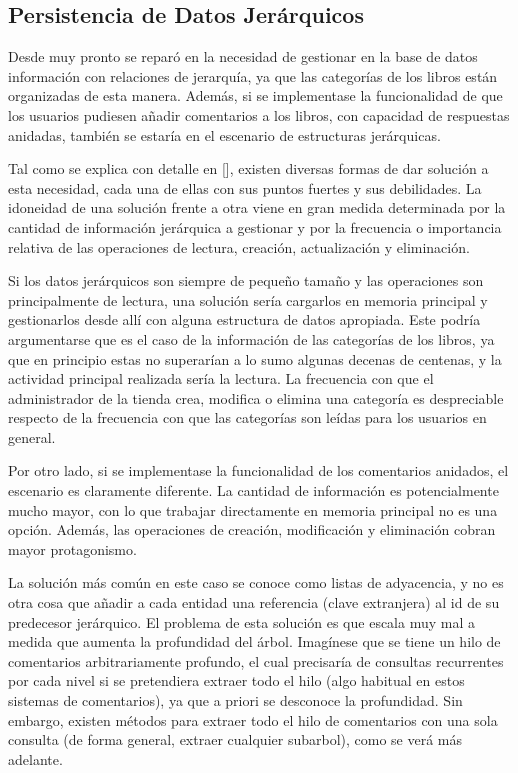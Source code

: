 \documentclass[a4paper]{report}
\begin{document}
    \subsection{Persistencia de Datos Jerárquicos}
    Desde muy pronto se reparó en la necesidad de gestionar en la base de datos información con relaciones de jerarquía, ya que las categorías de los libros están organizadas de esta manera. Además, si se implementase la funcionalidad de que los usuarios pudiesen añadir comentarios a los libros, con capacidad de respuestas anidadas, también se estaría en el escenario de estructuras jerárquicas.
    
    Tal como se explica con detalle en [], existen diversas formas de dar solución a esta necesidad, cada una de ellas con sus puntos fuertes y sus debilidades. La idoneidad de una solución frente a otra viene en gran medida determinada por la cantidad de información jerárquica a gestionar y por la frecuencia o importancia relativa de las operaciones de lectura, creación, actualización y eliminación.
    
    Si los datos jerárquicos son siempre de pequeño tamaño y las operaciones son principalmente de lectura, una solución sería cargarlos en memoria principal y gestionarlos desde allí con alguna estructura de datos apropiada. Este podría argumentarse que es el caso de la información de las categorías de los libros, ya que en principio estas no superarían a lo sumo algunas decenas de centenas, y la actividad principal realizada sería la lectura. La frecuencia con que el administrador de la tienda crea, modifica o elimina una categoría es despreciable respecto de la frecuencia con que las categorías son leídas para los usuarios en general.
    
    Por otro lado, si se implementase la funcionalidad de los comentarios anidados, el escenario es claramente diferente. La cantidad de información es potencialmente mucho mayor, con lo que trabajar directamente en memoria principal no es una opción. Además, las operaciones de creación, modificación y eliminación cobran mayor protagonismo.
    
    La solución más común en este caso se conoce como listas de adyacencia, y no es otra cosa que añadir a cada entidad una referencia (clave extranjera) al id de su predecesor jerárquico. El problema de esta solución es que escala muy mal a medida que aumenta la profundidad del árbol. Imagínese que se tiene un hilo de comentarios arbitrariamente profundo, el cual precisaría de consultas recurrentes por cada nivel si se pretendiera extraer todo el hilo (algo habitual en estos sistemas de comentarios), ya que a priori se desconoce la profundidad. Sin embargo, existen métodos para extraer todo el hilo de comentarios con una sola consulta (de forma general, extraer cualquier subarbol), como se verá más adelante.
    
\end{document}
